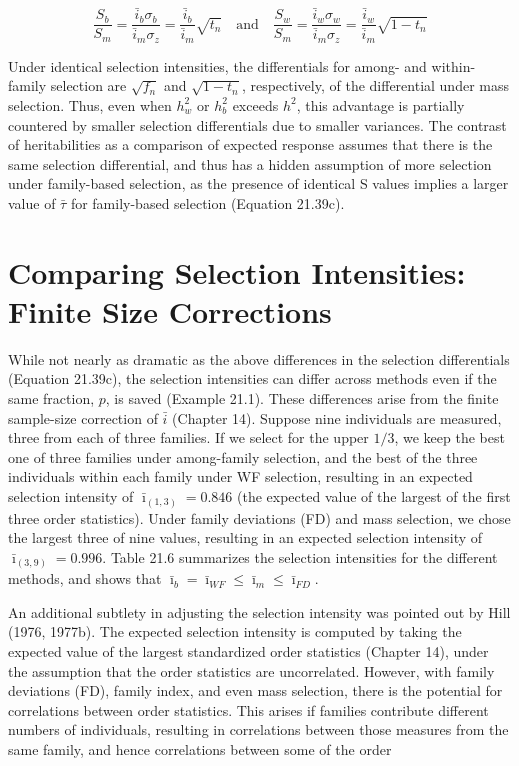 \documentclass{article}
\begin{document}
\begin{equation}
\frac{S_{b}}{S_{m}}=\frac{\bar{i}_{b}\sigma_{b}}{\bar{i}_{m}\sigma_{z}}=\frac{\bar{i}_{b}}{\bar{i}_{m}}\sqrt{t_{n}}\quad\mathrm{a n d}\quad\frac{S_{w}}{S_{m}}=\frac{\bar{i}_{w}\sigma_{w}}{\bar{i}_{m}\sigma_{z}}=\frac{\bar{i}_{w}}{\bar{i}_{m}}\sqrt{1-t_{n}}
\tag{21.39c}
\label{eq:21_39c}
\end{equation}

Under identical selection intensities, the differentials for among- and within-family selection are  $ \sqrt{f_n} $ and  $ \sqrt{1 - t_n} $, respectively, of the differential under mass selection. Thus, even when  $ h_w^2 $ or  $ h_b^2 $ exceeds  $ h^2 $, this advantage is partially countered by smaller selection differentials due to smaller variances. The contrast of heritabilities as a comparison of expected response assumes that there is the same selection differential, and thus has a hidden assumption of more selection under family-based selection, as the presence of identical S values implies a larger value of  $ \bar{\tau} $ for family-based selection (Equation 21.39c).

\section{Comparing Selection Intensities: Finite Size Corrections}
While not nearly as dramatic as the above differences in the selection differentials (Equation 21.39c), the selection intensities can differ across methods even if the same fraction, $p$, is saved (Example 21.1). These differences arise from the finite sample-size correction of $\bar{i}$ (Chapter 14). Suppose nine individuals are measured, three from each of three families. If we select for the upper $1/3$, we keep the best one of three families under among-family selection, and the best of the three individuals within each family under WF selection, resulting in an expected selection intensity of $\bar{\imath}_{(1,3)} = 0.846$ (the expected value of the largest of the first three order statistics). Under family deviations (FD) and mass selection, we chose the largest three of nine values, resulting in an expected selection intensity of $\bar{\imath}_{(3,9)} = 0.996$. Table 21.6 summarizes the selection intensities for the different methods, and shows that $\bar{\imath}_{b} = \bar{\imath}_{WF} \leq \bar{\imath}_{m} \leq \bar{\imath}_{FD}$.

An additional subtlety in adjusting the selection intensity was pointed out by Hill (1976, 1977b). The expected selection intensity is computed by taking the expected value of the largest standardized order statistics (Chapter 14), under the assumption that the order statistics are uncorrelated. However, with family deviations (FD), family index, and even mass selection, there is the potential for correlations between order statistics. This arises if families contribute different numbers of individuals, resulting in correlations between those measures from the same family, and hence correlations between some of the order
\end{document}
